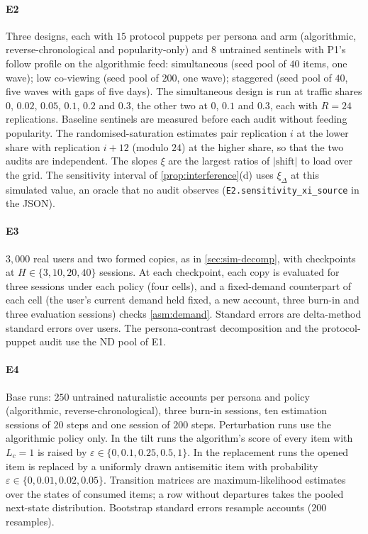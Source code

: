 \paragraph{E2} Three designs, each with $15$ protocol puppets per persona and arm (algorithmic, reverse-chronological and popularity-only) and $8$ untrained sentinels with P1's follow profile on the algorithmic feed: simultaneous (seed pool of $40$ items, one wave); low co-viewing (seed pool of $200$, one wave); staggered (seed pool of $40$, five waves with gaps of five days). The simultaneous design is run at traffic shares $0$, $0.02$, $0.05$, $0.1$, $0.2$ and $0.3$, the other two at $0$, $0.1$ and $0.3$, each with $R=24$ replications. Baseline sentinels are measured before each audit without feeding popularity. The randomised-saturation estimates pair replication $i$ at the lower share with replication $i+12$ (modulo $24$) at the higher share, so that the two audits are independent. The slopes $\xi$ are the largest ratios of $|\text{shift}|$ to load over the grid. The sensitivity interval of \cref{prop:interference}(d) uses $\xi_\Delta$ at this simulated value, an oracle that no audit observes (\texttt{E2.sensitivity\_xi\_source} in the JSON).

\paragraph{E3} $3{,}000$ real users and two formed copies, as in \cref{sec:sim-decomp}, with checkpoints at $H\in\{3,10,20,40\}$ sessions. At each checkpoint, each copy is evaluated for three sessions under each policy (four cells), and a fixed-demand counterpart of each cell (the user's current demand held fixed, a new account, three burn-in and three evaluation sessions) checks \cref{asm:demand}. Standard errors are delta-method standard errors over users. The persona-contrast decomposition and the protocol-puppet audit use the ND pool of E1.

\paragraph{E4} Base runs: $250$ untrained naturalistic accounts per persona and policy (algorithmic, reverse-chronological), three burn-in sessions, ten estimation sessions of $20$ steps and one session of $200$ steps. Perturbation runs use the algorithmic policy only. In the tilt runs the algorithm's score of every item with $L_c=1$ is raised by $\varepsilon\in\{0,0.1,0.25,0.5,1\}$. In the replacement runs the opened item is replaced by a uniformly drawn antisemitic item with probability $\varepsilon\in\{0,0.01,0.02,0.05\}$. Transition matrices are maximum-likelihood estimates over the states of consumed items; a row without departures takes the pooled next-state distribution. Bootstrap standard errors resample accounts ($200$ resamples).

